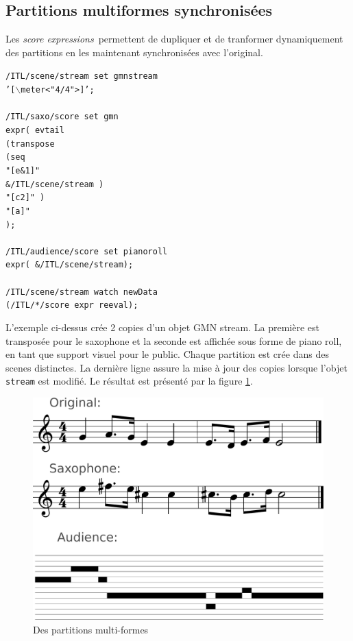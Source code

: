 \documentclass{article}
\newcommand{\OSC}[1]{\texttt{#1}}
\newcommand{\sExprs}{\emph{score expressions}}
\newcommand{\tab}{\hspace*{4mm}}
\newcommand{\sample}	[1]			{\vspace{-0.2em}\begin{center}\colorbox{mygrey}{\begin{minipage}[t]{0.97\columnwidth} {\small \texttt{#1}}\end{minipage}}\end{center}}
\begin{document}
\subsection{Partitions multiformes synchronisées}
\label{sample2}

Les \sExprs\ permettent de dupliquer et de tranformer dynamiquement des partitions en les maintenant synchronisées avec l'original.

\sample{/ITL/scene/stream set gmnstream \\
\tab '[$\backslash$meter<"4/4">]';\\
\\
/ITL/saxo/score set gmn \\
\tab expr( evtail\\
\tab \tab (transpose\\
\tab \tab \tab (seq\\
\tab \tab \tab \tab "[e\&1]"\\
\tab \tab \tab \tab \&/ITL/scene/stream )\\
\tab \tab \tab "[c2]" )\\
\tab \tab "[a]"\\
\tab );\\
\\
/ITL/audience/score set pianoroll \\
\tab expr( \&/ITL/scene/stream);\\
\\
/ITL/scene/stream watch newData\\
\tab(/ITL/*/score expr reeval);
}
L'exemple ci-dessus crée 2 copies d'un objet GMN stream. La première est transposée pour le saxophone et la seconde est affichée sous forme de piano roll, en tant que support visuel pour le public. Chaque partition est crée dans des scenes distinctes. La dernière ligne assure la mise à jour des copies lorsque l'objet \OSC{stream} est modifié. Le résultat est présenté par la figure \ref{fig:mutliscoreFig}.

\begin{figure}[th]
\centering
\includegraphics[width=0.9\columnwidth]{imgs/example1}
\caption{Des partitions multi-formes
\label{fig:mutliscoreFig}}
\end{figure}
\end{document}
